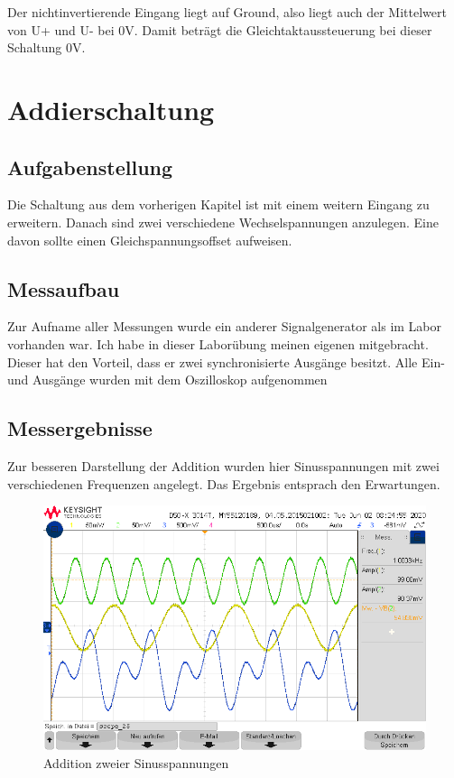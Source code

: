 Der nichtinvertierende Eingang liegt auf Ground, also liegt auch der Mittelwert von U+ und U- bei 0V. Damit beträgt die Gleichtaktaussteuerung bei dieser Schaltung 0V.
\section{Addierschaltung}
\subsection{Aufgabenstellung}
Die Schaltung aus dem vorherigen Kapitel ist mit einem weitern Eingang zu erweitern. Danach sind zwei verschiedene Wechselspannungen anzulegen. Eine davon sollte einen Gleichspannungsoffset aufweisen. 


\subsection{Messaufbau}
Zur Aufname aller Messungen wurde ein anderer Signalgenerator als im Labor vorhanden war. Ich habe in dieser Laborübung meinen eigenen mitgebracht. Dieser hat den Vorteil, dass er zwei synchronisierte Ausgänge besitzt. Alle Ein- und Ausgänge wurden mit dem Oszilloskop aufgenommen


\subsection{Messergebnisse}
Zur besseren Darstellung der Addition wurden hier Sinusspannungen mit zwei verschiedenen Frequenzen angelegt. Das Ergebnis entsprach den Erwartungen. 
\begin{figure}[H]
    \centering
    \includegraphics[width=\costumPicWidth]{Lab_1/Messungen/Addierer/scope_25.png}
    \caption{Addition zweier Sinusspannungen}
    \label{fig:Addierschaltung_Ergebnis}
\end{figure}

